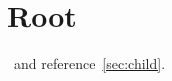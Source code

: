 \documentclass{article}
\begin{document}
\section{Root}
\projectword\ and reference~\ref{sec:child}.
\end{document}

